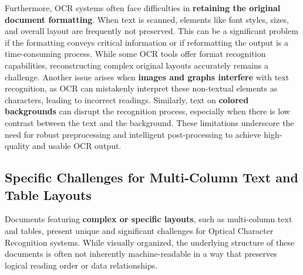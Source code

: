 Furthermore, OCR systems often face difficulties in \textbf{retaining the original document formatting}. When text is scanned, elements like font styles, sizes, and overall layout are frequently not preserved. This can be a significant problem if the formatting conveys critical information or if reformatting the output is a time-consuming process. While some OCR tools offer format recognition capabilities, reconstructing complex original layouts accurately remains a challenge. Another issue arises when \textbf{images and graphs interfere} with text recognition, as OCR can mistakenly interpret these non-textual elements as characters, leading to incorrect readings. Similarly, text on \textbf{colored backgrounds} can disrupt the recognition process, especially when there is low contrast between the text and the background. These limitations underscore the need for robust preprocessing and intelligent post-processing to achieve high-quality and usable OCR output.

\subsection{Specific Challenges for Multi-Column Text and Table Layouts}

Documents featuring \textbf{complex or specific layouts}, such as multi-column text and tables, present unique and significant challenges for Optical Character Recognition systems. While visually organized, the underlying structure of these documents is often not inherently machine-readable in a way that preserves logical reading order or data relationships.

